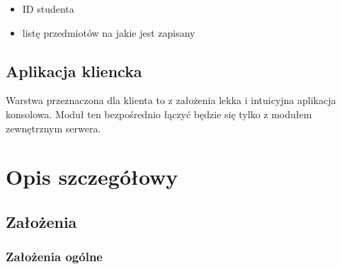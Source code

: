 \begin{itemize}
\item ID studenta
\item listę przedmiotów na jakie jest zapisany
\end{itemize}

\subsection*[Aplikacja kliencka]{Aplikacja kliencka}

\par{Warstwa przeznaczona dla klienta to z założenia lekka i  intuicyjna aplikacja konsolowa. Moduł ten bezpośrednio łączyć będzie się tylko z modułem zewnętrznym serwera.}

\section[Opis szczegółowy]{Opis szczegółowy}

\subsection[Założenia]{Założenia}

\subsubsection*[Założenia ogólne]{Założenia ogólne} \label{z:o}

